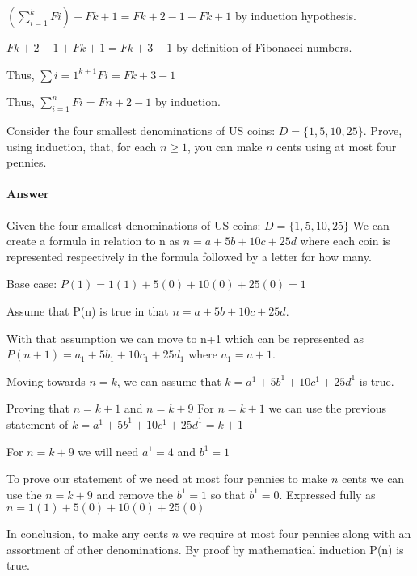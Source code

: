\documentclass{article}
\begin{document}
$(\sum_{i=1}^k Fi) + F{k+1} = F{k+2}-1 + F{k+1}$ by induction hypothesis.

$F{k+2}-1 + F{k+1} = F{k+3}-1$ by definition of Fibonacci numbers.

Thus, $\sum{i=1}^{k+1} Fi = F{k+3}-1$

Thus, $\sum_{i=1}^n Fi = F{n+2}-1$ by induction.

 

Consider the four smallest denominations of US coins: $D=\{1,5,10,25\}$.  Prove, using
induction, that, for each $n \geq 1$, you can make $n$ cents using at most four
pennies.

\paragraph{Answer}

Given the four smallest denominations of US coins: $D=\{1,5,10,25\}$ We can create
a formula in relation to n as $n = a+5b+10c+25d$ where each coin is represented respectively
in the formula followed by a letter for how many.

Base case: $P(1) = 1(1)+5(0)+10(0)+25(0) = 1$

Assume that P(n) is true in that $n = a+5b+10c+25d$.

With that assumption we can move to n+1 which can be represented as
$P(n+1) = a_1+5b_1+10c_1+25d_1$ where $a_1=a+1$.

Moving towards $n=k$, we can assume that $k = a^1+5b^1+10c^1+25d^1$ is true.

Proving that $n = k+1$ and $n =k+9$
For $n = k+1$ we can use the previous statement of $k = a^1+5b^1+10c^1+25d^1 = k+1$

For $n = k+9$ we will need $a^1=4$ and $b^1=1$

To prove our statement of we need at most four pennies to make $n$ cents we can
use the $n = k+9$ and remove the $b^1=1$ so that $b^1=0$. Expressed fully as
$n = 1(1)+5(0)+10(0)+25(0)$

In conclusion, to make any cents $n$ we require at most four pennies along with
an assortment of other denominations.
By proof by mathematical induction P(n) is true.


 
\end{document}
